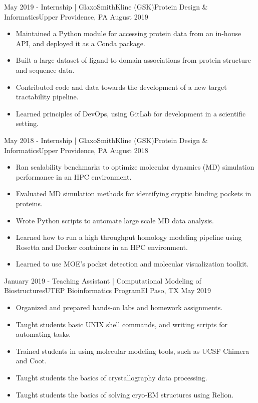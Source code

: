 \begin{experiences}
  \emptySeparator
  \experience
    {May 2019 -} {Internship | GlaxoSmithKline (GSK)}{Protein Design \& Informatics}{Upper Providence, PA}
    {August 2019}    {
        \begin{itemize}
        \item Maintained a Python module for accessing protein data from an in-house API, and deployed it as a Conda package.
        \item Built a large dataset of ligand-to-domain associations from protein structure and sequence data.
        \item Contributed code and data towards the development of a new target tractability pipeline.
        \item Learned principles of DevOps, using GitLab for development in a scientific setting.
        \end{itemize}
    }
  \emptySeparator
  \experience
    {May 2018 -} {Internship | GlaxoSmithKline (GSK)}{Protein Design \& Informatics}{Upper Providence, PA}
    {August 2018}    {
        \begin{itemize}
        \item Ran scalability benchmarks to optimize molecular dynamics (MD) simulation performance in an HPC environment.
        \item Evaluated MD simulation methods for identifying cryptic binding pockets in proteins.
        \item Wrote Python scripts to automate large scale MD data analysis.
        \item Learned how to run a high throughput homology modeling pipeline using Rosetta and Docker containers in an HPC environment.
        \item Learned to use MOE's pocket detection and molecular visualization toolkit.
        \end{itemize}
    }
                  
  \emptySeparator
  
  \experience
    {January 2019 -}     {Teaching Assistant | Computational Modeling of Biostructures}{UTEP Bioinformatics Program}{El Paso, TX}
    {May 2019}    {
        \begin{itemize}
        \item Organized and prepared hands-on labs and homework assignments.
        \item Taught students basic UNIX shell commands, and writing scripts for automating tasks.
        \item Trained students in using molecular modeling tools, such as UCSF Chimera and Coot.
        \item Taught students the basics of crystallography data processing.
        \item Taught students the basics of solving  cryo-EM structures using Relion.
        \end{itemize}
    }
                  

\end{experiences}
